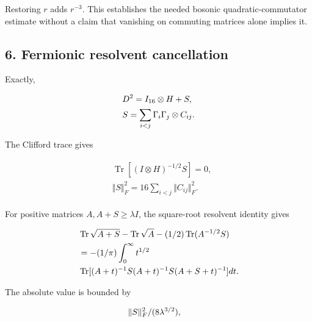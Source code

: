 Restoring \(r\) adds \(r^{-3}\). This establishes the needed bosonic
quadratic-commutator estimate without a claim that vanishing on
commuting matrices alone implies it.

\subsection{6. Fermionic resolvent
cancellation}\label{b-fermionic-resolvent-cancellation}

Exactly,

\begin{gather*}
\begin{aligned}
& D^{2}=I_{16} \otimes  H+S, \\
& S=\sum _{i<j} \Gamma _{i} \Gamma _{j} \otimes  C_{ij}.
\end{aligned}\notag
\end{gather*}

The Clifford trace gives

\begin{gather*}
\begin{aligned}
& \operatorname{Tr} [(I \otimes  H)^{-1/2}S]=0, \\
& \Vert S\Vert _{F}^{2}=16 \sum _{i<j}\Vert C_{ij}\Vert _{F}^{2}.
\end{aligned}\tag{7}
\end{gather*}

For positive matrices \(A,A+S\ge  \lambda  I\), the square-root
resolvent identity gives

\begin{gather*}
\begin{aligned}
& \operatorname{Tr}  \sqrt{A+S}-\operatorname{Tr}  \sqrt{A}-(1/2)\operatorname{Tr} (A^{-1/2}S) \\
& =-(1/ \pi  )\int _{0}^{\infty} t^{1/2} \\
& \operatorname{Tr} [(A+t)^{-1}S(A+t)^{-1}S(A+S+t)^{-1}] dt.
\end{aligned}\notag
\end{gather*}

The absolute value is bounded by

\begin{gather*}
\begin{aligned}
& \Vert S\Vert _{F}^{2}/(8 \lambda ^{3/2}),
\end{aligned}\notag
\end{gather*}

